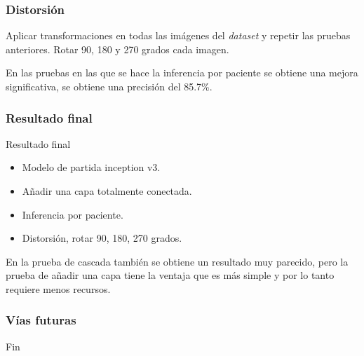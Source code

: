 \documentclass{beamer}
\begin{document}
\begin{frame}
\frametitle{Distorsión}

Aplicar transformaciones en todas las imágenes del \textit{dataset} y repetir las pruebas anteriores. Rotar 90, 180 y 270 grados cada imagen.

\begin{table}[H]
\centering
{}
\caption{Resultados pruebas con distorsión.}
\end{table}

En las pruebas en las que se hace la inferencia por paciente se obtiene una mejora significativa, se obtiene una precisión del 85.7\%.

\end{frame}



\begin{frame}
\frametitle{Resultado final}

\begin{block}{Resultado final}
\begin{itemize}
\item Modelo de partida inception v3.
\item Añadir una capa totalmente conectada.
\item Inferencia por paciente.
\item Distorsión, rotar 90, 180, 270 grados.
\end{itemize}
\end{block}

\bigskip

En la prueba de cascada también se obtiene un resultado muy parecido, pero la prueba de añadir una capa tiene la ventaja que es más simple y por lo tanto requiere menos recursos.

\end{frame}



\begin{frame}
\frametitle{Vías futuras}

\end{frame}



\begin{frame}
\Huge{\centerline{Fin}}
\end{frame}
\end{document}
